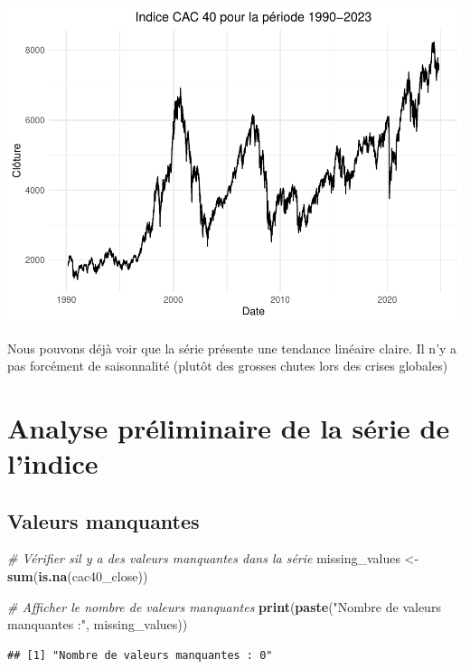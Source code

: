 \documentclass[
]{article}
\newenvironment{Shaded}{\begin{snugshade}}{\end{snugshade}}
\newcommand{\CommentTok}[1]{\textcolor[rgb]{0.56,0.35,0.01}{\textit{#1}}}
\newcommand{\FunctionTok}[1]{\textcolor[rgb]{0.13,0.29,0.53}{\textbf{#1}}}
\newcommand{\NormalTok}[1]{#1}
\newcommand{\OtherTok}[1]{\textcolor[rgb]{0.56,0.35,0.01}{#1}}
\newcommand{\StringTok}[1]{\textcolor[rgb]{0.31,0.60,0.02}{#1}}
\begin{document}
\includegraphics{projet_STA_files/figure-latex/unnamed-chunk-2-1.pdf}

Nous pouvons déjà voir que la série présente une tendance linéaire
claire. Il n'y a pas forcément de saisonnalité (plutôt des grosses
chutes lors des crises globales)

\hypertarget{analyse-pruxe9liminaire-de-la-suxe9rie-de-lindice}{%
\section{Analyse préliminaire de la série de
l'indice}\label{analyse-pruxe9liminaire-de-la-suxe9rie-de-lindice}}

\hypertarget{valeurs-manquantes}{%
\subsection{Valeurs manquantes}\label{valeurs-manquantes}}

\begin{Shaded}
\begin{Highlighting}[]
\CommentTok{\# Vérifier s\textquotesingle{}il y a des valeurs manquantes dans la série}
\NormalTok{missing\_values }\OtherTok{\textless{}{-}} \FunctionTok{sum}\NormalTok{(}\FunctionTok{is.na}\NormalTok{(cac40\_close))}

\CommentTok{\# Afficher le nombre de valeurs manquantes}
\FunctionTok{print}\NormalTok{(}\FunctionTok{paste}\NormalTok{(}\StringTok{"Nombre de valeurs manquantes :"}\NormalTok{, missing\_values))}
\end{Highlighting}
\end{Shaded}

\begin{verbatim}
## [1] "Nombre de valeurs manquantes : 0"
\end{verbatim}
\end{document}
